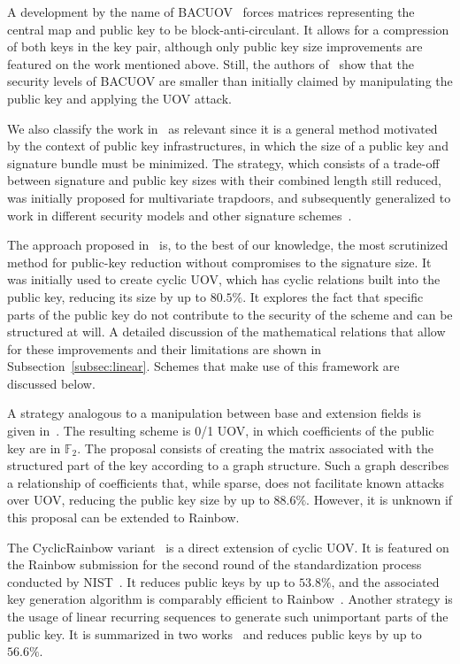 \documentclass[english]{ufsc-thesis-rn46-2019/ufsc-thesis-rn46-2019}
\theoremstyle{definition}
\begin{document}
A development by the name of BACUOV~\cite{Szepieniec:201908} forces matrices
representing the central map and public key to be block-anti-circulant. It
allows for a compression of both keys in the key pair, although only public key
size improvements are featured on the work mentioned above. Still, the authors
of~\cite{Furue:202004} show that the security levels of BACUOV are smaller than
initially claimed by manipulating the public key and applying the UOV attack.

We also classify the work in~\cite{Szepieniec:201706} as relevant since it is
a general method motivated by the context of public key infrastructures, in
which the size of a public key and signature bundle must be minimized. The
strategy, which consists of a trade-off between signature and public key sizes
with their combined length still reduced, was initially proposed for
multivariate trapdoors, and subsequently generalized to work in different
security models and other signature schemes~\cite{Beullens:201808}.

The approach proposed in~\cite{Petzoldt:201006} is, to the best of our
knowledge, the most scrutinized method for public-key reduction without
compromises to the signature size. It was initially used to create cyclic UOV,
which has cyclic relations built into the public key, reducing its size by up
to $80.5\%$. It explores the fact that specific parts of the public key do not
contribute to the security of the scheme and can be structured at
will. A detailed discussion of the mathematical relations that allow for these
improvements and their limitations are shown in
Subsection~\ref{subsec:linear}. Schemes that make use of this framework are
discussed below.

A strategy analogous to a manipulation between base and extension fields is
given in~\cite{Petzoldt:201109}. The resulting scheme is 0/1 UOV, in which
coefficients of the public key are in $\mathbb{F}_{2}$. The proposal consists
of creating the matrix associated with the structured part of the key according
to a graph structure. Such a graph describes a relationship of coefficients
that, while sparse, does not facilitate known attacks over UOV, reducing the
public key size by up to $88.6\%$. However, it is unknown if this proposal can
be extended to Rainbow.

The CyclicRainbow variant~\cite{Petzoldt:201012} is a direct extension of
cyclic UOV\@. It is featured on the Rainbow submission for the second round of
the standardization process conducted by NIST~\cite{Ding:201901}. It reduces
public keys by up to $53.8\%$, and the associated key generation algorithm is
comparably efficient to Rainbow~\cite{Petzoldt:202004}. Another strategy is the
usage of linear recurring sequences to generate such unimportant parts of the
public key. It is summarized in two
works~\cite{Petzoldt:201103,Petzoldt:201211} and reduces public keys by up to
$56.6\%$.
\end{document}
